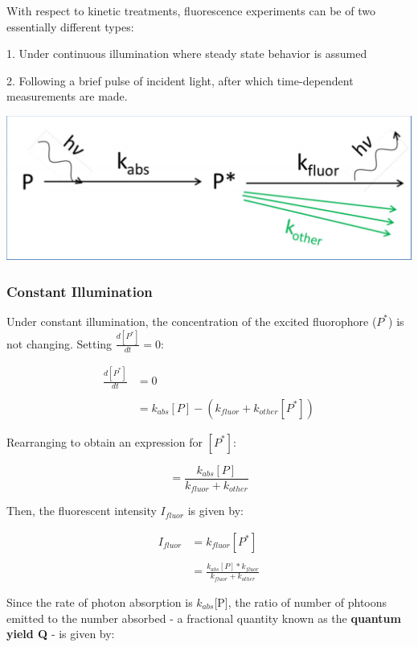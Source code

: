 \documentclass[12pt, letterpaper]{article}
\begin{document}
 With respect to kinetic treatments, fluorescence experiments can be of two essentially different types: 
 
 1. Under continuous illumination where steady state behavior is assumed

 2. Following a brief pulse of incident light, after which time-dependent measurements are made.

 \begin{center}
    \includegraphics[scale = 0.5]{fluorescent experiment.png}
 \end{center}

 \subsubsection*{Constant Illumination}
 Under constant illumination, the concentration of the excited fluorophore ($P^*$) is not changing. 
 Setting $\frac{d[P^*]}{dt} = 0$: 

 \begin{align*}
    \frac{d[P^*]}{dt} &= 0 \\ \\ 
    &= k_{abs}[P] - (k_{fluor} + k_{other}[P^*])
 \end{align*}

 Rearranging to obtain an expression for $[P^*]$: 

 \begin{equation*}
    [P^*] = \frac{k_{abs}[P]}{k_{fluor} + k_{other}}
 \end{equation*}

 Then, the fluorescent intensity $I_{fluor}$ is given by: 

 \begin{align*}
    I_{fluor} &= k_{fluor}[P^*] \\ \\
    &= \frac{k_{abs}[P] * k_{fluor}}{k_{fluor} + k_{other}}
 \end{align*}

 Since the rate of photon absorption is $k_{abs}$[P], the ratio of number of phtoons emitted to the number absorbed - a fractional quantity known as the \textbf{quantum yield Q}  - 
 is given by: 
\end{document}
